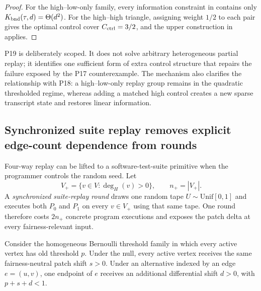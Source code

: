 \begin{proof}
For the high--low-only family, every information constraint in
 contains only
$K_{\rm bnd}(\tau,d)=\Theta(d^2)$.  For the high--high triangle, assigning
weight $1/2$ to each pair gives the optimal control cover
$C_{\rm ctrl}=3/2$, and the upper construction in
 applies.
\end{proof}

P19 is deliberately scoped.  It does not solve arbitrary heterogeneous partial
replay; it identifies one sufficient form of extra control structure that
repairs the failure exposed by the P17 counterexample.  The mechanism also
clarifies the relationship with P18: a high--low-only replay group remains in
the quadratic thresholded regime, whereas adding a matched high control creates
a new sparse transcript state and restores linear information.

\subsection{Synchronized suite replay removes explicit edge-count dependence from rounds}

Four-way replay can be lifted to a software-test-suite primitive when the
programmer controls the random seed.  Let
\[
V_+=\{v\in V:\deg_H(v)>0\},
\qquad
n_+=|V_+|.
\]
A \emph{synchronized suite-replay round} draws one random tape
\(U\sim\mathrm{Unif}[0,1]\) and executes both \(P_0\) and \(P_1\) on every
\(v\in V_+\) using that same tape.  One round therefore costs \(2n_+\) concrete
program executions and exposes the patch delta at every fairness-relevant input.

Consider the homogeneous Bernoulli threshold family in which every active vertex
has old threshold \(p\).  Under the null, every active vertex receives the same
fairness-neutral patch shift \(s>0\).  Under an alternative indexed by an edge
\(e=(u,v)\), one endpoint of \(e\) receives an additional differential shift
\(d>0\), with \(p+s+d<1\).

